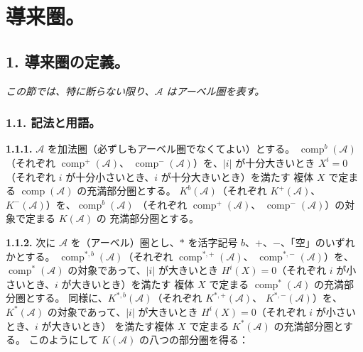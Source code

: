 \chapter{導来圏。}
%
\begingroup
\small
\setlength{\parskip}{0pt}
\setlength{\emergencystretch}{1.5em}
\setlength{\abovedisplayskip}{4pt plus 2pt minus 2pt}%
\setlength{\belowdisplayskip}{4pt plus 2pt minus 2pt}%

\section*{1. 導来圏の定義。}

\noindent\textit{この節では、特に断らない限り、$\mathcal A$ はアーベル圏を表す。}

\subsection*{1.1. 記法と用語。}

\noindent\textbf{1.1.1.}\quad
$\mathcal A$ を加法圏（必ずしもアーベル圏でなくてよい）とする。
$\operatorname{comp}^{b}(\mathcal A)$（それぞれ
$\operatorname{comp}^{+}(\mathcal A)$、
$\operatorname{comp}^{-}(\mathcal A)$）を、$|i|$ が十分大きいとき
$X^i=0$（それぞれ $i$ が十分小さいとき、$i$ が十分大きいとき）を満たす
複体 $X$ で定まる $\operatorname{comp}(\mathcal A)$ の充満部分圏とする。
$K^{b}(\mathcal A)$（それぞれ $K^{+}(\mathcal A)$、
$K^{-}(\mathcal A)$）を、$\operatorname{comp}^{b}(\mathcal A)$
（それぞれ $\operatorname{comp}^{+}(\mathcal A)$、
$\operatorname{comp}^{-}(\mathcal A)$）の対象で定まる $K(\mathcal A)$ の
充満部分圏とする。

\noindent\textbf{1.1.2.}\quad
次に $\mathcal A$ を（アーベル）圏とし、$*$ を活字記号
$b$、$+$、$-$、「空」のいずれかとする。
$\operatorname{comp}^{*,b}(\mathcal A)$（それぞれ
$\operatorname{comp}^{*,+}(\mathcal A)$、
$\operatorname{comp}^{*,-}(\mathcal A)$）を、
$\operatorname{comp}^{*}(\mathcal A)$ の対象であって、$|i|$ が大きいとき
$H^i(X)=0$（それぞれ $i$ が小さいとき、$i$ が大きいとき）を満たす
複体 $X$ で定まる $\operatorname{comp}^{*}(\mathcal A)$ の充満部分圏とする。
同様に、$K^{*,b}(\mathcal A)$（それぞれ $K^{*,+}(\mathcal A)$、
$K^{*,-}(\mathcal A)$）を、$K^{*}(\mathcal A)$ の対象であって、$|i|$
が大きいとき $H^i(X)=0$（それぞれ $i$ が小さいとき、$i$ が大きいとき）
を満たす複体 $X$ で定まる $K^{*}(\mathcal A)$ の充満部分圏とする。
このようにして $K(\mathcal A)$ の八つの部分圏を得る：

